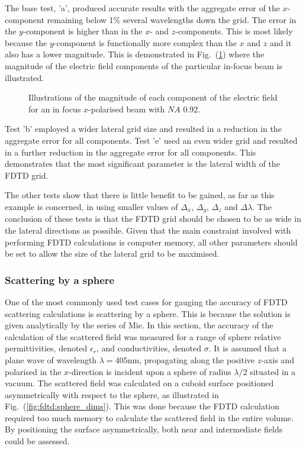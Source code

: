 \documentclass[a4paper, 12pt]{article}
\newcommand{\rfig}[1]{Fig.\ (\ref{#1})}
\begin{document}
	The base test, 'a', produced accurate results with the aggregate error
	of the $x$-component
	remaining below 1\% several wavelengths down the grid. The error in
	the $y$-component is higher than in the $x$- and $z$-components. This
	is most likely because the $y$-component is functionally more complex
	than the $x$ and $z$ and it also has a lower magnitude. This is
	demonstrated in \rfig{fig:fdtd:rw_field} where the magnitude of the electric field
	components of the particular in-focus beam is illustrated.
	\begin{figure}[!h]
		\centering
		\caption{Illustrations of the magnitude of each component of the
			electric field for an in focus $x$-polarised beam with $NA$ 0.92.}
		\label{fig:fdtd:rw_field}
	\end{figure}

	Test 'b' employed a wider lateral grid size and resulted in a
	reduction in the aggregate error for all components. Test 'e' used an
	even wider grid and resulted in a further reduction in the aggregate
	error for all components. This demonstrates that the most significant
	parameter is the lateral width of the FDTD grid.

	The other tests show that there is little benefit to be gained, as far
	as this example is concerned, in using smaller values of $\Delta_x$,
	$\Delta_y$, $\Delta_z$ and $\Delta\lambda$. The conclusion of these
	tests is that the FDTD grid should be chosen to be as wide in the
	lateral directions as possible. Given that the main constraint
	involved with performing FDTD calculations is computer memory, all
	other parameters should be set to allow the size of the lateral grid
	to be maximised.

	\subsubsection{Scattering by a sphere}
	One of the most commonly used test cases for gauging the accuracy of
	FDTD scattering calculations is scattering by a sphere. This is
	because the solution is given analytically by the series of Mie. In this section, the accuracy of the calculation
	of the scattered field was measured for a range of sphere relative
	permittivities, denoted $\epsilon_r$, and conductivities, denoted
	$\sigma$. It is assumed that a plane wave of wavelength $\lambda=405$nm, propagating along the
	positive $z$-axis and polarised in the $x$-direction is incident upon
	a sphere of radius $\lambda/2$ situated in a vacuum. The scattered field was calculated on
	a cuboid surface positioned asymmetrically with respect to the sphere,
	as illustrated in \rfig{fig:fdtd:sphere_dims}. This was done because
	the FDTD calculation required too much memory to calculate the scattered field in the
	entire volume. By positioning the surface asymmetrically, both near
	and intermediate fields could be assessed.
\end{document}
